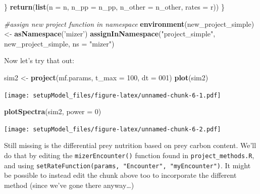 \documentclass[
]{article}
\newenvironment{Shaded}{\begin{snugshade}}{\end{snugshade}}
\newcommand{\CommentTok}[1]{\textcolor[rgb]{0.56,0.35,0.01}{\textit{#1}}}
\newcommand{\DataTypeTok}[1]{\textcolor[rgb]{0.13,0.29,0.53}{#1}}
\newcommand{\DecValTok}[1]{\textcolor[rgb]{0.00,0.00,0.81}{#1}}
\newcommand{\KeywordTok}[1]{\textcolor[rgb]{0.13,0.29,0.53}{\textbf{#1}}}
\newcommand{\NormalTok}[1]{#1}
\newcommand{\StringTok}[1]{\textcolor[rgb]{0.31,0.60,0.02}{#1}}
\begin{document}
\begin{Shaded}
\begin{Highlighting}[]
\NormalTok{\}}
  \KeywordTok{return}\NormalTok{(}\KeywordTok{list}\NormalTok{(}\DataTypeTok{n =}\NormalTok{ n, }\DataTypeTok{n_pp =}\NormalTok{ n_pp, }\DataTypeTok{n_other =}\NormalTok{ n_other, }\DataTypeTok{rates =}\NormalTok{ r))}
\NormalTok{\}}


\CommentTok{#assign new project function in namespace}
\KeywordTok{environment}\NormalTok{(new_project_simple) <-}\StringTok{ }\KeywordTok{asNamespace}\NormalTok{(}\StringTok{'mizer'}\NormalTok{)}
\KeywordTok{assignInNamespace}\NormalTok{(}\StringTok{"project_simple"}\NormalTok{, new_project_simple, }\DataTypeTok{ns =} \StringTok{"mizer"}\NormalTok{)}
\end{Highlighting}
\end{Shaded}

Now let's try that out:

\begin{Shaded}
\begin{Highlighting}[]
\NormalTok{sim2 <-}\StringTok{ }\KeywordTok{project}\NormalTok{(mf.params, }\DataTypeTok{t_max =} \DecValTok{100}\NormalTok{, }\DataTypeTok{dt =} \DecValTok{001}\NormalTok{)}
\KeywordTok{plot}\NormalTok{(sim2)}
\end{Highlighting}
\end{Shaded}

\texttt{[image: setupModel\_files/figure-latex/unnamed-chunk-6-1.pdf]}

\begin{Shaded}
\begin{Highlighting}[]
\KeywordTok{plotSpectra}\NormalTok{(sim2, }\DataTypeTok{power =} \DecValTok{0}\NormalTok{)}
\end{Highlighting}
\end{Shaded}

\texttt{[image: setupModel\_files/figure-latex/unnamed-chunk-6-2.pdf]}

Still missing is the differential prey nutrition based on prey carbon
content. We'll do that by editing the \texttt{mizerEncounter()} function
found in \texttt{project\_methods.R}, and using
\texttt{setRateFunction(params,\ "Encounter",\ "myEncounter")}. It might
be possible to instead edit the chunk above too to incorporate the
different method (since we've gone there anyway\ldots)
\end{document}
